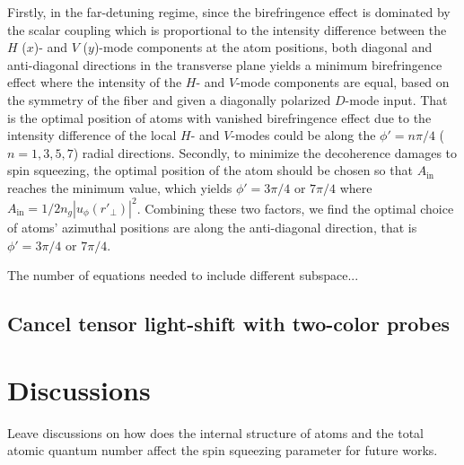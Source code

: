 \documentclass[preprint,aps,pra,onecolumn,superscriptaddress]{revtex4-1} %
\newcommand{\comment}[1]{{\color{Maroon} #1}}
\begin{document}
Firstly, in the far-detuning regime, since the birefringence effect is dominated by the scalar coupling which is proportional to the intensity difference between the $H$ ($x$)- and $V$ ($ y $)-mode components at the atom positions, both diagonal and anti-diagonal directions in the transverse plane yields a minimum birefringence effect where the intensity of the $ H $- and $ V $-mode components are equal, based on the symmetry of the fiber and given a diagonally polarized $ D $-mode input.
That is the optimal position of atoms with vanished birefringence effect due to the intensity difference of the local $ H $- and $ V $-modes could be along the $ \phi'=n\pi/4 $ ($ n=1,3,5,7 $) radial directions. 
Secondly, to minimize the decoherence damages to spin squeezing, the optimal position of the atom should be chosen so that $ A_{\mathrm{in}} $ reaches the minimum value, which yields $ \phi'=3\pi/4 $ or $ 7\pi/4 $ where $ A_{\mathrm{in}}=1/2n_g|u_\phi(r'\!_\perp)|^2 $.
Combining these two factors, we find the optimal choice of atoms' azimuthal positions are along the anti-diagonal direction, that is $\phi'=3\pi/4 $ or $ 7\pi/4 $.

The number of equations needed to include different subspace...

\subsection{Cancel tensor light-shift with two-color probes}



\section{Discussions} \label{Sec::Discussions}
\comment{Leave discussions on how does the internal structure of atoms and the total atomic quantum number affect the spin squeezing parameter for future works.}


\renewcommand{\thesubfigure}{(\alph{subfigure})}
\end{document}
